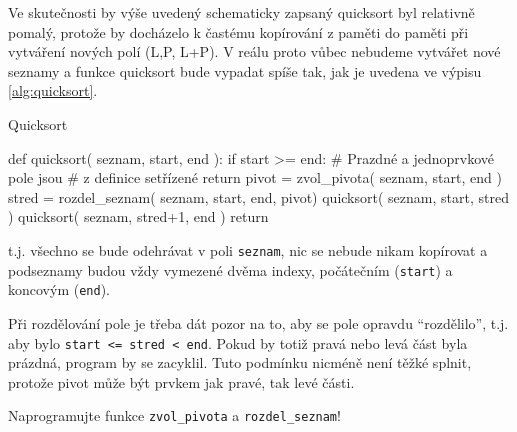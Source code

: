\begin{remark} Ve skutečnosti by výše uvedený schematicky zapsaný quicksort byl relativně pomalý,
protože by docházelo k častému kopírování z paměti do paměti při vytváření nových polí (L,P, L+P).
V reálu proto vůbec nebudeme vytvářet nové seznamy a funkce quicksort bude vypadat spíše tak, jak je uvedena ve výpisu \ref{alg:quicksort}.

\begin{program}\caption{Quicksort}\label{alg:quicksort}
\begin{python}
def quicksort( seznam, start, end ):
    if start >= end:
        # Prazdné a jednoprvkové pole jsou
        # z definice setřízené
        return  
    pivot = zvol_pivota( seznam, start, end )
    stred = rozdel_seznam( seznam, start, end, pivot)
    quicksort( seznam, start, stred )
    quicksort( seznam, stred+1, end )
    return
\end{python}
\end{program}

t.j. všechno se bude odehrávat v poli {\tt seznam}, nic se nebude nikam kopírovat a podseznamy budou
vždy vymezené dvěma indexy, počátečním ({\tt start}) a koncovým ({\tt end}).
\end{remark}

\begin{remark} Při rozdělování pole je třeba dát pozor na to, aby se pole opravdu ``rozdělilo'', t.j.
aby bylo {\tt start <= stred < end}. Pokud by totiž pravá nebo levá část byla prázdná, program 
by se zacyklil. Tuto podmínku nicméně není těžké splnit, protože pivot může být prvkem jak pravé,
tak levé části.
\end{remark}

\begin{cviceni} Naprogramujte funkce {\tt zvol\_pivota} a {\tt rozdel\_seznam}!
\end{cviceni}

